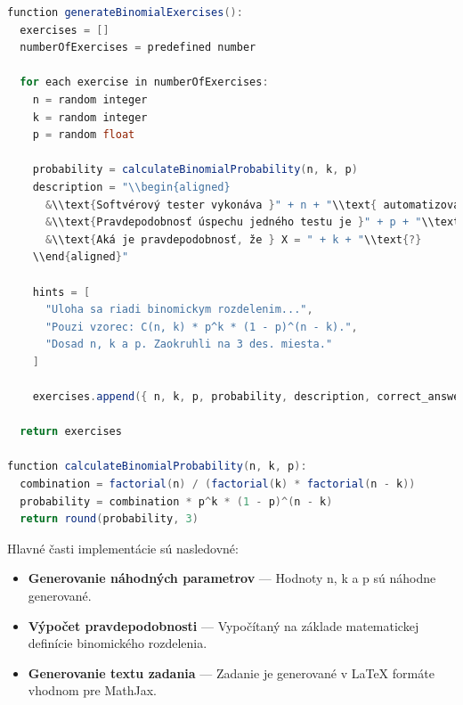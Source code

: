 \begin{lstlisting}[caption={Ukážka generovania úloh s binomickým rozdelením}, label={lst:binomial-gen}, language=java, style=code-listing]
function generateBinomialExercises():
  exercises = []
  numberOfExercises = predefined number

  for each exercise in numberOfExercises:
    n = random integer 
    k = random integer 
    p = random float 

    probability = calculateBinomialProbability(n, k, p)
    description = "\\begin{aligned}
      &\\text{Softvérový tester vykonáva }" + n + "\\text{ automatizovaných testov.} \\\\
      &\\text{Pravdepodobnosť úspechu jedného testu je }" + p + "\\text{.} \\\\
      &\\text{Aká je pravdepodobnosť, že } X = " + k + "\\text{?}
    \\end{aligned}"

    hints = [
      "Uloha sa riadi binomickym rozdelenim...",
      "Pouzi vzorec: C(n, k) * p^k * (1 - p)^(n - k).",
      "Dosad n, k a p. Zaokruhli na 3 des. miesta."
    ]

    exercises.append({ n, k, p, probability, description, correct_answer: probability, points: 3, hints })

  return exercises

function calculateBinomialProbability(n, k, p):
  combination = factorial(n) / (factorial(k) * factorial(n - k))
  probability = combination * p^k * (1 - p)^(n - k)
  return round(probability, 3)
\end{lstlisting}


Hlavné časti implementácie sú nasledovné:

\begin{itemize} \item \textbf{Generovanie náhodných parametrov} — Hodnoty 
n, k a p sú náhodne generované. \item \textbf{Výpočet pravdepodobnosti} — Vypočítaný na základe matematickej definície binomického rozdelenia. 
\item \textbf{Generovanie textu zadania} — Zadanie je generované v LaTeX formáte vhodnom pre MathJax. \end{itemize}


